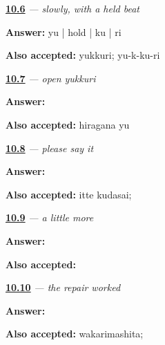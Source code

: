 \noindent\begin{minipage}[t]{\linewidth}
\raggedright
\hyperlink{review-JA-C10-yukkuri-timing}{\textbf{10.6}} \emph{ — slowly, with a held beat}\par
\small \textbf{Answer:} yu | hold | ku | ri\par
\footnotesize \textbf{Also accepted:} yukkuri; yu-k-ku-ri
\end{minipage}\par\medskip

\noindent\begin{minipage}[t]{\linewidth}
\raggedright
\hyperlink{review-JA-W10-yu-write}{\textbf{10.7}} \emph{ — open yukkuri}\par
\small \textbf{Answer:} \par
\footnotesize \textbf{Also accepted:} hiragana yu
\end{minipage}\par\medskip

\noindent\begin{minipage}[t]{\linewidth}
\raggedright
\hyperlink{review-JA-C10-itte-kudasai-request}{\textbf{10.8}} \emph{ — please say it}\par
\small \textbf{Answer:} \par
\footnotesize \textbf{Also accepted:} itte kudasai; 
\end{minipage}\par\medskip

\noindent\begin{minipage}[t]{\linewidth}
\raggedright
\hyperlink{review-JA-C10-mou-sukoshi-write}{\textbf{10.9}} \emph{ — a little more}\par
\small \textbf{Answer:} \par
\footnotesize \textbf{Also accepted:} 
\end{minipage}\par\medskip

\noindent\begin{minipage}[t]{\linewidth}
\raggedright
\hyperlink{review-JA-C10-wakarimashita-success}{\textbf{10.10}} \emph{ — the repair worked}\par
\small \textbf{Answer:} \par
\footnotesize \textbf{Also accepted:} wakarimashita; 
\end{minipage}\par\medskip

